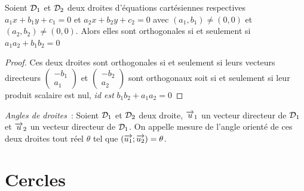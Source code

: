 \begin{prop}
  Soient \(\mathcal{D}_1\) et \(\mathcal{D}_2\) deux droites d'équations cartésiennes respectives \(a_1x+b_1y+c_1=0\) et \(a_2x+b_2y+c_2=0\) avec \((a_1,b_1) \neq (0,0)\) et \((a_2,b_2) \neq (0,0)\). Alors elles sont orthogonales si et seulement si \(a_1 a_2 + b_1 b_2=0\)
\end{prop}
\begin{proof}
  Ces deux droites sont orthogonales si et seulement si leurs vecteurs directeurs \(\begin{pmatrix} -b_1 \\ a_1 \end{pmatrix}\) et \(\begin{pmatrix} -b_2 \\ a_2 \end{pmatrix}\) sont orthogonaux soit si et seulement si leur produit scalaire est nul, \emph{id est} \(b_1 b_2 + a_1 a_2=0\)
\end{proof}

\emph{Angles de droites}~:
Soient \(\mathcal{D}_1\) et \(\mathcal{D}_2\) deux droite, \(\overrightarrow{u}_1\) un vecteur directeur de \(\mathcal{D}_1\) et \(\overrightarrow{u}_2\) un vecteur directeur de \(\mathcal{D}_1\). On appelle mesure de l'angle orienté de ces deux droites tout réel \(\theta\) tel que \((\overrightarrow{u_1};\overrightarrow{u_2})=\theta\).

\section{Cercles}
\label{sec:cercle}
